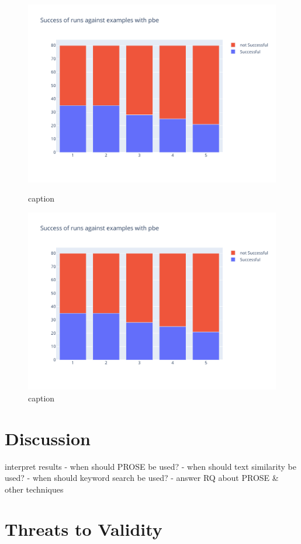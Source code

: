 \documentclass[\myrootdir/main.tex]{subfiles}
\begin{document}
\begin{figure}[hp]
	\centering
	\begin{minipage}{0.45\textwidth}
		\centering
		\includegraphics[width=\textwidth, clip]{img/big-study/success-examples-pbe.pdf}
		\caption{caption}
		\label{fig:success-examples-pbe}
	\end{minipage}\hfill
	\begin{minipage}{0.45\textwidth}
		\centering
		\includegraphics[width=\textwidth, clip]{img/big-study/success-examples-pbe.pdf}
		\caption{caption}
		\label{fig:success-examples-pbe2}
	\end{minipage}
\end{figure}

\section{Discussion}

interpret results - when should PROSE be used? - when should text similarity be used? - when should keyword search be used? - answer RQ about PROSE \& other techniques
\section{Threats to Validity}
\end{document}

